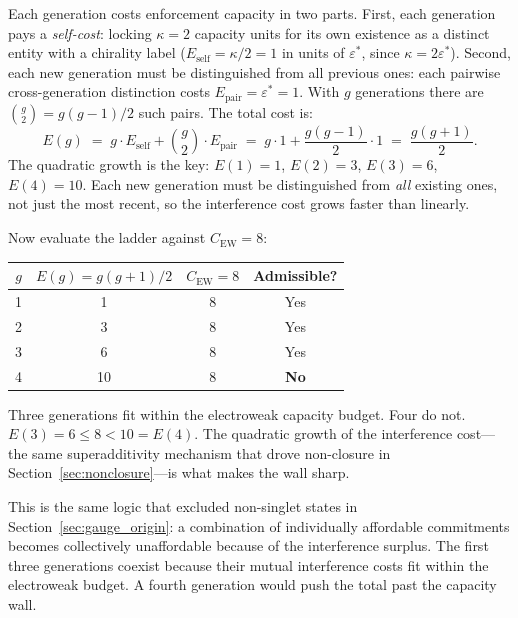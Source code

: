 \documentclass[11pt]{article}
\begin{document}
Each generation costs enforcement capacity in two parts.  First, each generation pays a \emph{self-cost}: locking $\kappa = 2$ capacity units for its own existence as a distinct entity with a chirality label ($E_{\mathrm{self}} = \kappa/2 = 1$ in units of $\varepsilon^*$, since $\kappa = 2\varepsilon^*$).  Second, each new generation must be distinguished from all previous ones: each pairwise cross-generation distinction costs $E_{\mathrm{pair}} = \varepsilon^* = 1$.  With $g$ generations there are $\binom{g}{2} = g(g-1)/2$ such pairs.  The total cost is:
\begin{equation}
E(g) \;=\; g \cdot E_{\mathrm{self}} + \binom{g}{2} \cdot E_{\mathrm{pair}} \;=\; g \cdot 1 + \frac{g(g-1)}{2} \cdot 1 \;=\; \frac{g(g+1)}{2}.
\label{eq:capacity_ladder}
\end{equation}
The quadratic growth is the key: $E(1) = 1$, $E(2) = 3$, $E(3) = 6$, $E(4) = 10$.  Each new generation must be distinguished from \emph{all} existing ones, not just the most recent, so the interference cost grows faster than linearly.

Now evaluate the ladder against $C_{\mathrm{EW}} = 8$:

\begin{center}
\begin{tabular}{cccc}
\toprule
$g$ & $E(g) = g(g+1)/2$ & $C_{\mathrm{EW}} = 8$ & Admissible? \\
\midrule
1 & 1 & 8 & Yes \\
2 & 3 & 8 & Yes \\
3 & 6 & 8 & Yes \\
4 & 10 & 8 & \textbf{No} \\
\bottomrule
\end{tabular}
\end{center}

Three generations fit within the electroweak capacity budget.  Four do not.  $E(3) = 6 \le 8 < 10 = E(4)$.  The quadratic growth of the interference cost---the same superadditivity mechanism that drove non-closure in Section~\ref{sec:nonclosure}---is what makes the wall sharp.

This is the same logic that excluded non-singlet states in Section~\ref{sec:gauge_origin}: a combination of individually affordable commitments becomes collectively unaffordable because of the interference surplus.  The first three generations coexist because their mutual interference costs fit within the electroweak budget.  A fourth generation would push the total past the capacity wall.
\end{document}
